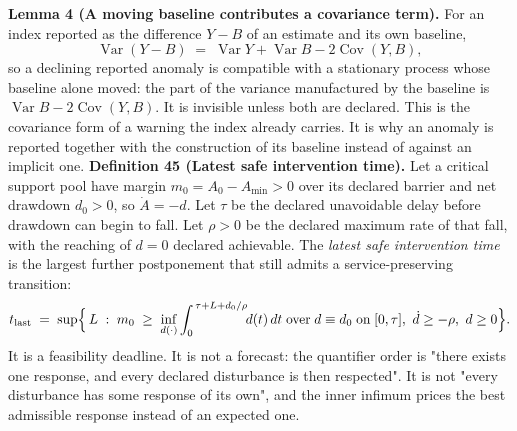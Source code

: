 \documentclass[11pt]{article}
\begin{document}
\textbf{Lemma 4 (A moving baseline contributes a covariance term).} For an index reported as the difference \(Y - B\) of an estimate and its own baseline, \[ \operatorname{Var}(Y - B) \;=\; \operatorname{Var} Y + \operatorname{Var} B - 2\operatorname{Cov}(Y, B) , \] so a declining reported anomaly is compatible with a stationary process whose baseline alone moved: the part of the variance manufactured by the baseline is \(\operatorname{Var} B - 2\operatorname{Cov}(Y, B)\). It is invisible unless both are declared. This is the covariance form of a warning the index already carries. It is why an anomaly is reported together with the construction of its baseline instead of against an implicit one. \textbf{Definition 45 (Latest safe intervention time).} Let a critical support pool have margin \(m_0 = A_0 - A_{\min} > 0\) over its declared barrier and net drawdown \(d_0 > 0\), so \(\dot A = -d\). Let \(\tau\) be the declared unavoidable delay before drawdown can begin to fall. Let \(\rho > 0\) be the declared maximum rate of that fall, with the reaching of \(d = 0\) declared achievable. The \emph{latest safe
intervention time} is the largest further postponement that still admits a service-preserving transition: \[ t_{\mathrm{last}} \;=\; \sup\Bigl\{\, L \;:\; m_0 \;\ge\; \inf_{d(\cdot)} \int_0^{\,\tau+L+d_0/\rho} \!\! d(t)\,dt \;\text{over}\; d \equiv d_0 \;\text{on}\; [0,\tau],\ \dot d \ge -\rho,\ d \ge 0 \Bigr\} . \] It is a feasibility deadline. It is not a forecast: the quantifier order is "there exists one response, and every declared disturbance is then respected". It is not "every disturbance has some response of its own", and the inner infimum prices the best admissible response instead of an expected one.
\end{document}
